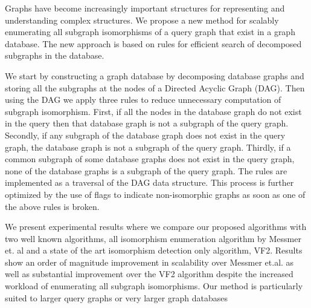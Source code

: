 
Graphs have become increasingly important structures for representing and understanding complex structures.
We propose a new method for scalably enumerating all subgraph isomorphisms of a query graph that exist in a graph database. The new approach is based on rules for efficient search of decomposed subgraphs in the database.

We start by constructing a graph database by decomposing database graphs and storing all the subgraphs at the nodes of a Directed Acyclic Graph (DAG). Then using the DAG we apply three rules to reduce unnecessary computation of subgraph isomorphism. First, if all the nodes in the database graph do not exist in the query then that database graph is not a subgraph of the query graph. Secondly, if any subgraph of the database graph does not exist in the query graph, the database graph is not a subgraph of the query graph. Thirdly, if a common subgraph of some database graphs does not exist in the query graph, none of the database graphs is a subgraph of the query graph. The rules are implemented as a traversal of the DAG data structure. This process is further optimized by the use of flags to indicate non-isomorphic graphs as soon as one of the above rules is broken. 

We present experimental results where we compare our proposed algorithms with two well known algorithms, all isomorphism enumeration algorithm by Messmer et. al and a state of the art isomorphism detection only algorithm, VF2. Results show an order of magnitude improvement in scalability over Messmer et.al. as well as substantial improvement over the VF2 algorithm despite the increased workload of enumerating all subgraph isomorphisms. Our method is particularly suited to larger query graphs or very larger graph databases


